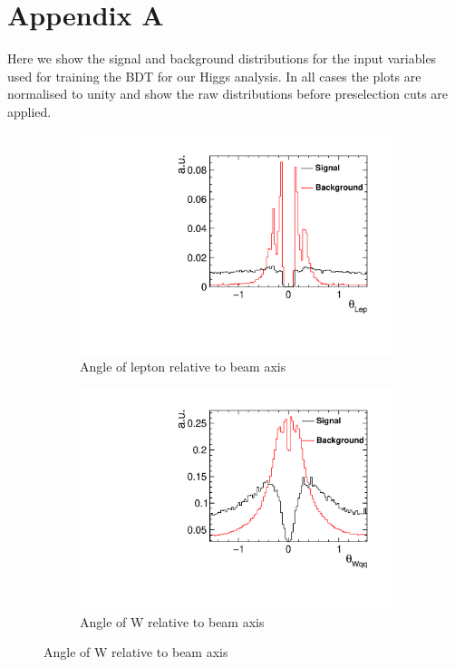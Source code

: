 \chapter{Appendix A}
\label{appendixA}
Here we show the signal and background distributions for the input variables used for training the BDT for our Higgs analysis. In all cases the plots are normalised to unity and show the raw distributions before preselection cuts are applied.

\begin{figure}[ht] 
  \begin{subfigure}[b]{0.5\linewidth}
    \centering
    \includegraphics[width=0.75\linewidth]{Appendix/figures/DiraLep} 
    \caption{Angle of lepton relative to beam axis} 
    \vspace{4ex}
  \end{subfigure}%
  \begin{subfigure}[b]{0.5\linewidth}
    \centering
    \includegraphics[width=0.75\linewidth]{Appendix/figures/DiraWqq} 
    \caption{Angle of W relative to beam axis} 
    \vspace{4ex}
  \end{subfigure} 
\end{figure}

